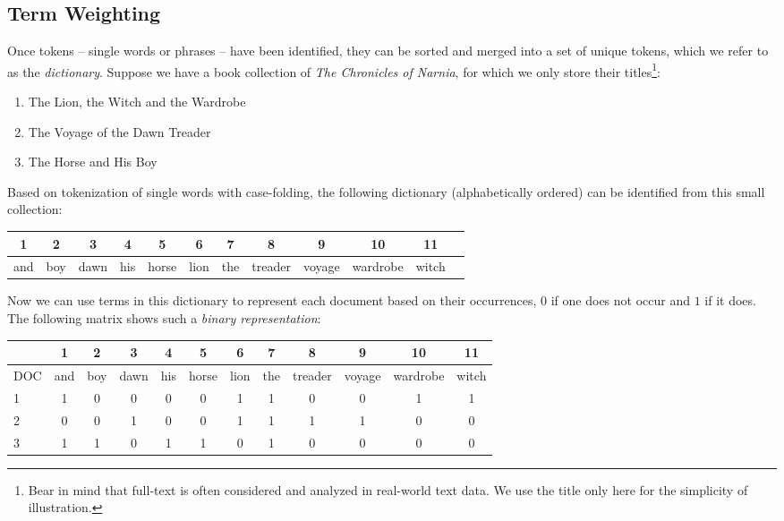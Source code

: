 \documentclass[
  letterpaper,
]{scrbook}
\newcounter{none} %
\begin{document}
\subsection{Term Weighting}\label{fig-text-weight}

Once tokens -- single words or phrases -- have been identified, they can
be sorted and merged into a set of unique tokens, which we refer to as
the \emph{dictionary}. Suppose we have a book collection of \emph{The
Chronicles of Narnia}, for which we only store their titles\footnote{Bear
  in mind that full-text is often considered and analyzed in real-world
  text data. We use the title only here for the simplicity of
  illustration.}:

\begin{enumerate}
\def\labelenumi{\arabic{enumi}.}
\item
  The Lion, the Witch and the Wardrobe
\item
  The Voyage of the Dawn Treader
\item
  The Horse and His Boy
\end{enumerate}

Based on tokenization of single words with case-folding, the following
dictionary (alphabetically ordered) can be identified from this small
collection:

{\def\LTcaptype{none} %
\begin{longtable}[]{@{}cccccccccccl@{}}
\toprule\noalign{}
1 & 2 & 3 & 4 & 5 & 6 & 7 & 8 & 9 & 10 & 11 & \\
\midrule\noalign{}
\endhead
\bottomrule\noalign{}
\endlastfoot
and & boy & dawn & his & horse & lion & the & treader & voyage &
wardrobe & witch & \\
\end{longtable}
}

Now we can use terms in this dictionary to represent each document based
on their occurrences, \(0\) if one does not occur and \(1\) if it does.
The following matrix shows such a \emph{binary representation}:

{\def\LTcaptype{none} %
\begin{longtable}[]{@{}lccccccccccc@{}}
\toprule\noalign{}
& 1 & 2 & 3 & 4 & 5 & 6 & 7 & 8 & 9 & 10 & 11 \\
\midrule\noalign{}
\endhead
\bottomrule\noalign{}
\endlastfoot
DOC & and & boy & dawn & his & horse & lion & the & treader & voyage &
wardrobe & witch \\
1 & 1 & 0 & 0 & 0 & 0 & 1 & 1 & 0 & 0 & 1 & 1 \\
2 & 0 & 0 & 1 & 0 & 0 & 1 & 1 & 1 & 1 & 0 & 0 \\
3 & 1 & 1 & 0 & 1 & 1 & 0 & 1 & 0 & 0 & 0 & 0 \\
\end{longtable}
}
\end{document}
